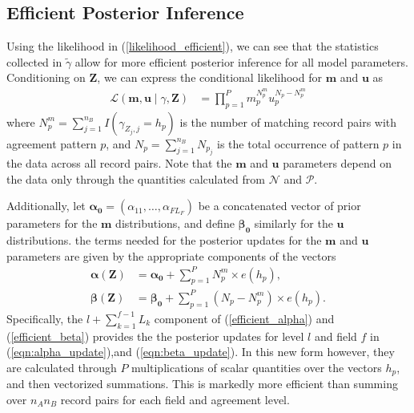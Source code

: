 \documentclass[ba]{imsart}
\begin{document}
\hypertarget{efficient-posterior}{%
	\subsection{Efficient Posterior Inference }\label{efficient-posterior}}

Using the likelihood in (\ref{likelihood_efficient}), we can see that the statistics collected in $\tilde{\gamma}$ allow for more efficient posterior inference for all model parameters. Conditioning on $\bm{Z}$, we can express the conditional likelihood for $\bm{m}$ and $\bm{u}$ as
\begin{align}
	\mathcal{L}(\bm{m}, \bm{u} \mid \gamma, \bm{Z})  &=  \prod_{p=1}^P m_p^{N_p^m}u_p^{N_p - N_p^m}  \label{likelihood_efficient_m_u}
\end{align}
where $N_p^m = \sum_{j=1}^{n_B} I\left(\gamma_{Z_j, j} = h_p \right)$ is the number of matching record pairs with agreement pattern $p$, and $N_p = \sum_{j=1}^{n_B} N_{p_j}$ is the total occurrence of pattern $p$ in the data across all record pairs. Note that the $\bm{m}$ and $\bm{u}$ parameters depend on the data only through the quantities calculated from $\mathcal{N}$ and $\mathcal{P}$. 

Additionally, let $\bm{\alpha_0} = (\alpha_{11}, \ldots, \alpha_{F L_F})$ be a concatenated vector of prior parameters for the $\bm{m}$ distributions, and define $\bm{\beta_0}$ similarly for the $\bm{u}$ distributions. { the terms needed for the posterior updates for the $\bm{m}$ and $\bm{u}$ parameters are given by the appropriate components of the vectors
\begin{subequations}
	\begin{align}
		\bm{\alpha(Z)} &= \bm{\alpha_0} + \sum_{p=1}^P N_p^m \times e(h_p), \label{efficient_alpha} \\
		\bm{\beta(Z)} &= \bm{\beta_0} + \sum_{p=1}^P (N_p - N_p^m) \times e(h_p). \label{efficient_beta}
	\end{align}
\end{subequations}
Specifically, the $l + \sum_{k=1}^{f-1} L_k$ component of (\ref{efficient_alpha}) and (\ref{efficient_beta}) provides the the posterior updates for level $l$ and field $f$ in (\ref{eqn:alpha_update}),and (\ref{eqn:beta_update}). In this new form however, they are calculated through $P$ multiplications of scalar quantities over the vectors $h_p$, and then vectorized summations.} This is markedly more efficient than summing over $n_A n_B$ record pairs for each field and agreement level.
\end{document}
